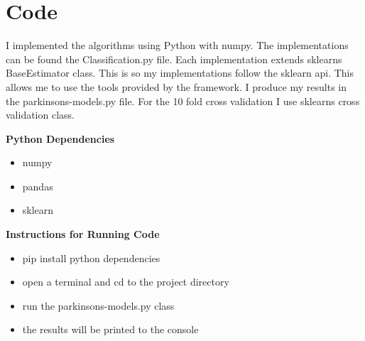 \section{Code}
I implemented the algorithms using Python with numpy.
The implementations can be found the Classification.py file. 
Each implementation extends sklearns BaseEstimator class. 
This is so my implementations follow the sklearn api.
This allows me to use the tools provided by the framework.
I produce my results in the parkinsons-models.py file.
For the 10 fold cross validation I use sklearns cross validation class.
\par
\par
\textbf{Python Dependencies}
\begin{itemize}
    \item numpy
    \item pandas
    \item sklearn
\end{itemize}
 \par
 \par
\textbf{Instructions for Running Code}
\begin{itemize}
    \item pip install python dependencies
    \item open a terminal and cd to the project directory
    \item run the parkinsons-models.py class
    \item the results will be printed to the console
\end{itemize}
